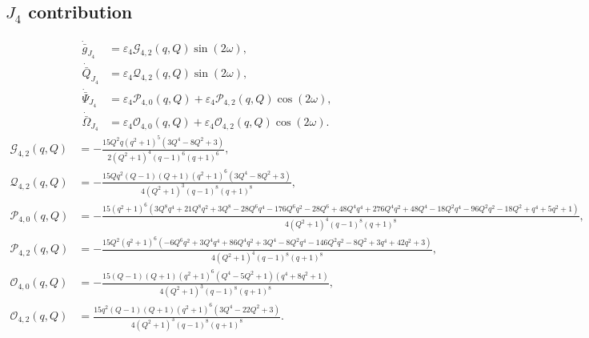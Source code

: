 \documentclass[10pt]{article}
\begin{document}
\subsection*{$J_4$ contribution}
\begin{align}
\dot{\bar g}_{J_4} &= \varepsilon_4 \mathcal{G}_{4,2}(q,Q)\sin(2\omega),\\
\dot{\bar Q}_{J_4} &= \varepsilon_4 \mathcal{Q}_{4,2}(q,Q)\sin(2\omega),\\
\dot{\bar\Psi}_{J_4} &= \varepsilon_4 \mathcal{P}_{4,0}(q,Q) + \varepsilon_4 \mathcal{P}_{4,2}(q,Q)\cos(2\omega),\\
\dot{\bar\Omega}_{J_4} &= \varepsilon_4 \mathcal{O}_{4,0}(q,Q) + \varepsilon_4 \mathcal{O}_{4,2}(q,Q)\cos(2\omega).
\end{align}
\begingroup\footnotesize
\begin{align}
\mathcal{G}_{4,2}(q,Q) &= - \frac{15 Q^{2} q \left(q^{2} + 1\right)^{5} \left(3 Q^{4} - 8 Q^{2} + 3\right)}{2 \left(Q^{2} + 1\right)^{4} \left(q - 1\right)^{6} \left(q + 1\right)^{6}},\\
\mathcal{Q}_{4,2}(q,Q) &= - \frac{15 Q q^{2} \left(Q - 1\right) \left(Q + 1\right) \left(q^{2} + 1\right)^{6} \left(3 Q^{4} - 8 Q^{2} + 3\right)}{4 \left(Q^{2} + 1\right)^{3} \left(q - 1\right)^{8} \left(q + 1\right)^{8}},\\
\mathcal{P}_{4,0}(q,Q) &= - \frac{15 \left(q^{2} + 1\right)^{6} \left(3 Q^{8} q^{4} + 21 Q^{8} q^{2} + 3 Q^{8} - 28 Q^{6} q^{4} - 176 Q^{6} q^{2} - 28 Q^{6} + 48 Q^{4} q^{4} + 276 Q^{4} q^{2} + 48 Q^{4} - 18 Q^{2} q^{4} - 96 Q^{2} q^{2} - 18 Q^{2} + q^{4} + 5 q^{2} + 1\right)}{4 \left(Q^{2} + 1\right)^{4} \left(q - 1\right)^{8} \left(q + 1\right)^{8}},\\
\mathcal{P}_{4,2}(q,Q) &= - \frac{15 Q^{2} \left(q^{2} + 1\right)^{6} \left(- 6 Q^{6} q^{2} + 3 Q^{4} q^{4} + 86 Q^{4} q^{2} + 3 Q^{4} - 8 Q^{2} q^{4} - 146 Q^{2} q^{2} - 8 Q^{2} + 3 q^{4} + 42 q^{2} + 3\right)}{4 \left(Q^{2} + 1\right)^{4} \left(q - 1\right)^{8} \left(q + 1\right)^{8}},\\
\mathcal{O}_{4,0}(q,Q) &= - \frac{15 \left(Q - 1\right) \left(Q + 1\right) \left(q^{2} + 1\right)^{6} \left(Q^{4} - 5 Q^{2} + 1\right) \left(q^{4} + 8 q^{2} + 1\right)}{4 \left(Q^{2} + 1\right)^{3} \left(q - 1\right)^{8} \left(q + 1\right)^{8}},\\
\mathcal{O}_{4,2}(q,Q) &= \frac{15 q^{2} \left(Q - 1\right) \left(Q + 1\right) \left(q^{2} + 1\right)^{6} \left(3 Q^{4} - 22 Q^{2} + 3\right)}{4 \left(Q^{2} + 1\right)^{3} \left(q - 1\right)^{8} \left(q + 1\right)^{8}}.
\end{align}
\endgroup
\end{document}
